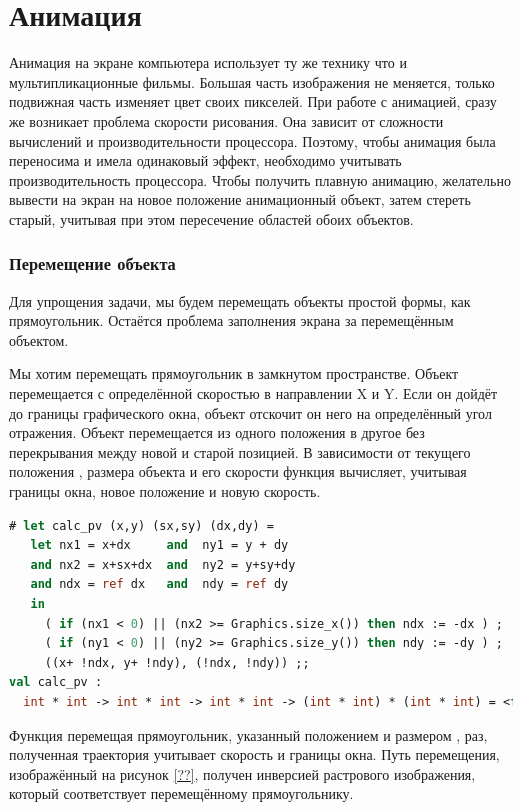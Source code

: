 \section{Анимация}
\label{sec:animation}

Анимация на экране компьютера использует ту же технику что и мультипликационные 
фильмы. Большая часть изображения не меняется, только подвижная часть изменяет 
цвет своих пикселей. При работе с анимацией, сразу же возникает проблема 
скорости рисования. Она зависит от сложности вычислений и производительности 
процессора. Поэтому, чтобы анимация была переносима и имела одинаковый эффект, 
необходимо учитывать производительность процессора. Чтобы получить плавную 
анимацию, желательно вывести на экран на новое положение анимационный объект, 
затем стереть старый, учитывая при этом пересечение областей обоих объектов.

\subsubsection{Перемещение объекта}

Для упрощения задачи, мы будем перемещать объекты простой формы, как 
прямоугольник. Остаётся проблема заполнения экрана за перемещённым объектом.

Мы хотим перемещать прямоугольник в замкнутом пространстве. Объект перемещается 
с определённой скоростью в направлении X и Y. Если он дойдёт до границы 
графического окна, объект отскочит он него на определённый угол отражения. 
Объект перемещается из одного положения в другое без перекрывания между новой и 
старой позицией. В зависимости от текущего положения , размера 
объекта  и его скорости  функция  
вычисляет, учитывая границы окна, новое положение и новую скорость.

\begin{lstlisting}[language=OCaml]
# let calc_pv (x,y) (sx,sy) (dx,dy) = 
   let nx1 = x+dx     and  ny1 = y + dy
   and nx2 = x+sx+dx  and  ny2 = y+sy+dy
   and ndx = ref dx   and  ndy = ref dy 
   in  
     ( if (nx1 < 0) || (nx2 >= Graphics.size_x()) then ndx := -dx ) ;
     ( if (ny1 < 0) || (ny2 >= Graphics.size_y()) then ndy := -dy ) ;
     ((x+ !ndx, y+ !ndy), (!ndx, !ndy)) ;;
val calc_pv :
  int * int -> int * int -> int * int -> (int * int) * (int * int) = <fun>
\end{lstlisting}

Функция перемещая прямоугольник, указанный положением  и размером 
,  раз, полученная траектория учитывает скорость 
 и границы окна. Путь перемещения, изображённый на рисунок 
\ref{??}, получен инверсией растрового изображения, который соответствует 
перемещённому прямоугольнику.

